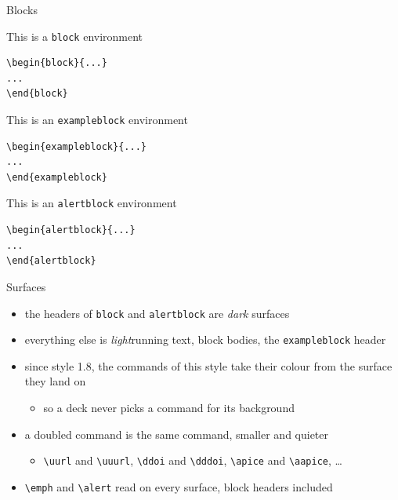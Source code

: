 \documentclass[presentation,bologna,apice]{beamer}\mode<presentation>{\usetheme{AMSUniBo}}
\begin{document}
\begin{frame}[c,fragile]{Blocks}
%
\begin{block}{This is a \texttt{block} environment}
\begin{verbatim}
\begin{block}{...}
...
\end{block}
\end{verbatim}
\end{block}
%
\begin{exampleblock}{This is an \texttt{exampleblock} environment}
\begin{verbatim}
\begin{exampleblock}{...}
...
\end{exampleblock}
\end{verbatim}
\end{exampleblock}
%
\begin{alertblock}{This is an \texttt{alertblock} environment}
\begin{verbatim}
\begin{alertblock}{...}
...
\end{alertblock}
\end{verbatim}
\end{alertblock}
%
\end{frame}

\begin{frame}[c]{Surfaces}
%
\begin{itemize}
	\item the headers of \texttt{block} and \texttt{alertblock} are \emph{dark} surfaces
	\item everything else is \emph{light}\textemdash{}running text, block bodies, the \texttt{exampleblock} header
	\item since style 1.8, the commands of this style take their colour from the surface they land on
	\begin{itemize}
		\item so a deck never picks a command for its background
	\end{itemize}
	\item a doubled command is the same command, \alert{smaller and quieter}
	\begin{itemize}
		\item \texttt{\textbackslash{}uurl} and \texttt{\textbackslash{}uuurl}, \texttt{\textbackslash{}ddoi} and \texttt{\textbackslash{}dddoi}, \texttt{\textbackslash{}apice} and \texttt{\textbackslash{}aapice}, \ldots
	\end{itemize}
	\item \texttt{\textbackslash{}emph} and \texttt{\textbackslash{}alert} read on every surface, block headers included
\end{itemize}
%
\end{frame}
\end{document}
